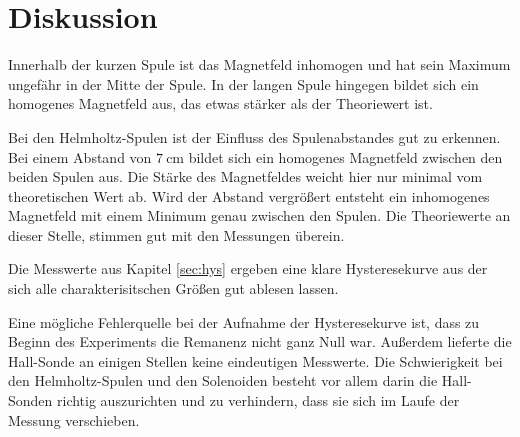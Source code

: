 \section{Diskussion}

Innerhalb der kurzen Spule ist das Magnetfeld inhomogen und hat sein Maximum ungefähr in der Mitte der Spule.
In der langen Spule hingegen bildet sich ein homogenes Magnetfeld aus, das etwas stärker als der Theoriewert ist.

Bei den Helmholtz-Spulen ist der Einfluss des Spulenabstandes gut zu erkennen.
Bei einem Abstand von $\SI{7}{\centi \meter}$ bildet sich ein homogenes Magnetfeld zwischen den beiden Spulen aus.
Die Stärke des Magnetfeldes weicht hier nur minimal vom theoretischen Wert ab.
Wird der Abstand vergrößert entsteht ein inhomogenes Magnetfeld mit einem Minimum genau zwischen den Spulen.
Die Theoriewerte an dieser Stelle, stimmen gut mit den Messungen überein.

Die Messwerte aus Kapitel \ref{sec:hys} ergeben eine klare Hysteresekurve aus der sich alle charakterisitschen
Größen gut ablesen lassen.

Eine mögliche Fehlerquelle bei der Aufnahme der Hysteresekurve ist, dass zu Beginn des Experiments die Remanenz
nicht ganz Null war. Außerdem lieferte die Hall-Sonde an einigen Stellen keine eindeutigen Messwerte.
Die Schwierigkeit bei den Helmholtz-Spulen und den Solenoiden besteht vor allem darin die Hall-Sonden richtig
auszurichten und zu verhindern, dass sie sich im Laufe der Messung verschieben.
